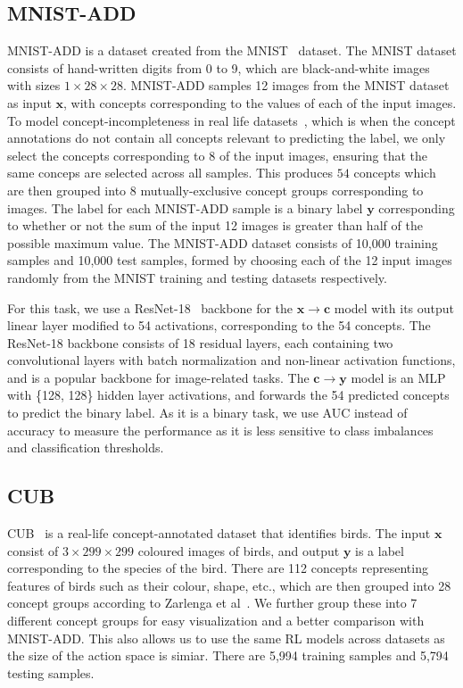 \subsection{MNIST-ADD}
MNIST-ADD is a dataset created from 
the MNIST~\cite{mnist} dataset. 
The MNIST dataset consists of hand-written digits from 0 to 9,
which are black-and-white images with sizes $1 \times 28 \times 28$.
MNIST-ADD samples
12 images from the MNIST dataset as input $\mathbf{x}$,
with concepts corresponding to the values of each of the input images.
To model concept-incompleteness in real life datasets~\cite{cem},
which is when the 
concept annotations do not contain all
concepts relevant to predicting the label, we only select the concepts corresponding to 8
of the input images, ensuring that the same conceps are selected across
all samples. This produces $54$ concepts which are then grouped into 8 
mutually-exclusive concept groups corresponding to images.
The label for each MNIST-ADD sample
is a binary label $\mathbf{y}$ corresponding to whether or not the sum of the input
12 images is greater than half of the possible maximum value.
The MNIST-ADD dataset consists of 
 10,000 training samples and 10,000 test samples, formed by choosing
each of the 12 input images randomly from the MNIST training and testing
datasets respectively.

For this task, we use a ResNet-18~\cite{resnet} backbone for the $\mathbf{x} \to \mathbf{c}$
model with its output linear layer modified to 54 activations, corresponding
to the 54 concepts. The ResNet-18 backbone consists of 18 residual layers,
each containing two convolutional layers with batch normalization and non-linear
activation functions, and is a popular backbone for image-related tasks.
The $\mathbf{c} \to \mathbf{y}$ model is an MLP with \{128, 128\} hidden
layer activations, and forwards the 54 predicted concepts to predict the binary label.
As it is a binary task, we use AUC instead of accuracy to measure the performance 
as it is less sensitive to class imbalances 
and classification thresholds.

\subsection{CUB}

CUB~\cite{cub} is a real-life concept-annotated dataset that identifies birds.
The input $\mathbf{x}$ consist of $3 \times 299 \times 299$ coloured images of 
 birds, and output $\mathbf{y}$ is a label corresponding to the species of the bird.
There are 
112 concepts 
representing features of birds such as their colour, shape, etc.,
which are then grouped into 28 concept groups according
to Zarlenga et al~\cite{intcem}. We further group these
into 7 different concept groups for easy visualization and a better comparison
with MNIST-ADD. This also allows us to use the same RL models across datasets
as the size of the action space is simiar. There are 
5,994 training samples and 5,794 testing samples.

